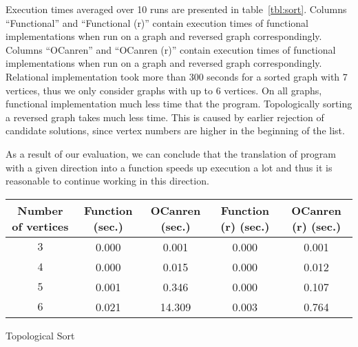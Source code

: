 Execution times averaged over 10 runs are presented in table~\ref{tbl:sort}.
Columns ``Functional'' and ``Functional (r)'' contain execution times of functional implementations when run on a graph and reversed graph correspondingly.
Columns ``OCanren'' and ``OCanren (r)'' contain execution times of functional implementations when run on a graph and reversed graph correspondingly.
Relational implementation took more than 300 seconds for a sorted graph with 7 vertices, thus we only consider graphs with up to 6 vertices.
On all graphs, functional implementation much less time that the \mk program.
Topologically sorting a reversed graph takes much less time.
This is caused by earlier rejection of candidate solutions, since vertex numbers are higher in the beginning of the list.

As a result of our evaluation, we can conclude that the translation of \mk program with a given direction into a function speeds up execution a lot and thus it is reasonable to continue working in this direction.

\begin{table*}
  \caption{Execution times of the OCanren and functional implementations of \lstinline{topsorto}}
  \label{tbl:sort}
  \begin{tabular}{ccccc}
    \toprule
    Number of vertices&Function (sec.)&OCanren (sec.)&Function (r) (sec.)&OCanren (r) (sec.)\\
    \midrule
    $3$ & 0.000 & 0.001  & 0.000 & 0.001 \\
    $4$ & 0.000 & 0.015  & 0.000 & 0.012 \\
    $5$ & 0.001 & 0.346  & 0.000 & 0.107 \\
    $6$ & 0.021 & 14.309 & 0.003 & 0.764 \\
  \bottomrule
\end{tabular}
\end{table*}

Topological Sort
